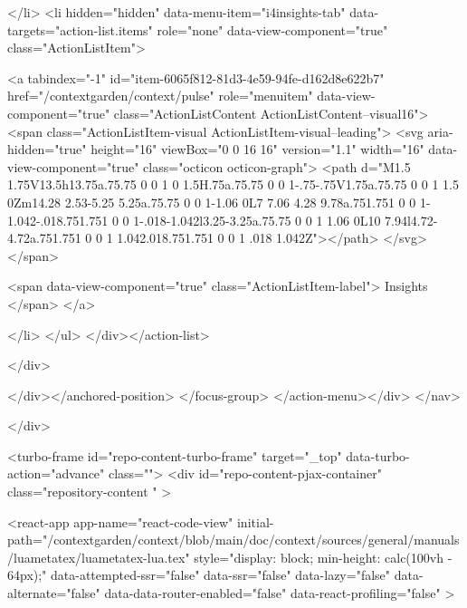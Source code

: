 </li>
        <li hidden="hidden" data-menu-item="i4insights-tab" data-targets="action-list.items" role="none" data-view-component="true" class="ActionListItem">
    
    
    <a tabindex="-1" id="item-6065f812-81d3-4e59-94fe-d162d8e622b7" href="/contextgarden/context/pulse" role="menuitem" data-view-component="true" class="ActionListContent ActionListContent--visual16">
        <span class="ActionListItem-visual ActionListItem-visual--leading">
          <svg aria-hidden="true" height="16" viewBox="0 0 16 16" version="1.1" width="16" data-view-component="true" class="octicon octicon-graph">
    <path d="M1.5 1.75V13.5h13.75a.75.75 0 0 1 0 1.5H.75a.75.75 0 0 1-.75-.75V1.75a.75.75 0 0 1 1.5 0Zm14.28 2.53-5.25 5.25a.75.75 0 0 1-1.06 0L7 7.06 4.28 9.78a.751.751 0 0 1-1.042-.018.751.751 0 0 1-.018-1.042l3.25-3.25a.75.75 0 0 1 1.06 0L10 7.94l4.72-4.72a.751.751 0 0 1 1.042.018.751.751 0 0 1 .018 1.042Z"></path>
</svg>
        </span>
      
        <span data-view-component="true" class="ActionListItem-label">
          Insights
</span>      
</a>
  
</li>
</ul>    
</div></action-list>


</div>
      
</div></anchored-position>  </focus-group>
</action-menu></div>
</nav>

  </div>

  



<turbo-frame id="repo-content-turbo-frame" target="_top" data-turbo-action="advance" class="">
    <div id="repo-content-pjax-container" class="repository-content " >
    



    
      
    








<react-app
  app-name="react-code-view"
  initial-path="/contextgarden/context/blob/main/doc/context/sources/general/manuals/luametatex/luametatex-lua.tex"
    style="display: block; min-height: calc(100vh - 64px);"
  data-attempted-ssr="false"
  data-ssr="false"
  data-lazy="false"
  data-alternate="false"
  data-data-router-enabled="false"
  data-react-profiling="false"
>
  
